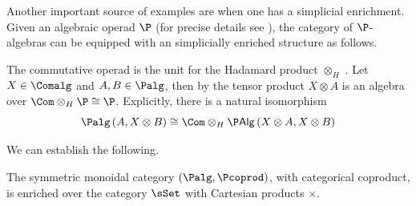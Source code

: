 \documentclass{tac}
\begin{document}
Another important source of examples are when one has a simplicial enrichment. Given an algebraic operad $\P$ (for precise details see \cite{loday12}), the category of $\P$-algebras can be equipped with an simplicially enriched structure as follows.
\begin{recollection}
\label{recol4}
The commutative operad is the unit for the Hadamard product $\otimes_H$ \cite[Section 5.3.3]{loday12}. Let $X\in \Comalg$ and $A,B\in \Palg$, then by \cite[Proposition 5.3.4]{loday12} the tensor product $X \otimes A$ is an algebra over $\Com\otimes_H \P \cong \P$. Explicitly, there is a natural isomorphism
$$
\Palg\left(A, X\otimes B\right) \cong \Com\otimes_H \P \mathsf{Alg}\left(X\otimes A, X\otimes B\right)
$$
\end{recollection}
We can establish the following.
\begin{proposition}
\label{propa5}
    The symmetric monoidal category $(\Palg, \Pcoprod)$, with categorical coproduct, is enriched over the category $\sSet$ with Cartesian products $\times$.
\end{proposition}
\end{document}
